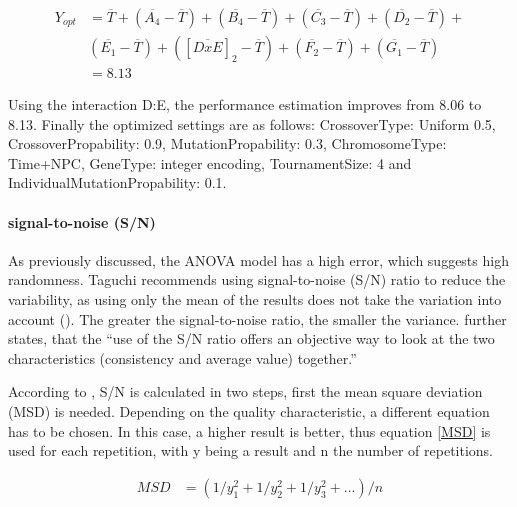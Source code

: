 \begin{equation} \label{optimum_perf_included_interaction}
	\begin{split}
		Y_{opt} &= \overline{T} + (\overline{A_4} - \overline{T}) + (\overline{B_4} - \overline{T}) + (\overline{C_3} - \overline{T}) + (\overline{D_2} - \overline{T}) + \\& (\overline{E_1} - \overline{T})  + ([\overline{DxE}]_2 - \overline{T})  + (\overline{F_2} - \overline{T}) + (\overline{G_1} - \overline{T}) \\
		&= 8.13
	\end{split}
\end{equation}

Using the interaction D:E, the performance estimation improves from 8.06 to 8.13. Finally the optimized settings are as follows:
CrossoverType: Uniform 0.5, CrossoverPropability: 0.9, MutationPropability: 0.3, ChromosomeType: Time+NPC, GeneType: integer encoding, TournamentSize: 4 and IndividualMutationPropability: 0.1.


\paragraph{signal-to-noise (S/N)}
As previously discussed, the ANOVA model has a high error, which suggests high randomness. Taguchi recommends using signal-to-noise (S/N) ratio to reduce the variability, as using only the mean of the results does not take the variation into account (\cite{roy_primer_1990}). The greater the signal-to-noise ratio, the smaller the variance. \cite{roy_primer_1990} further states, that the \enquote{use of the S/N ratio offers an objective way to look at the two characteristics (consistency and average value) together.}

According to \cite{roy_primer_1990}, S/N is calculated in two steps, first the mean square deviation (MSD) is needed. Depending on the quality characteristic, a different equation has to be chosen. In this case, a higher result is better, thus equation \ref{MSD} is used for each repetition, with y being a result and n the number of repetitions.

\begin{equation} \label{MSD}
	\begin{split}
		MSD & = (1/y^2_1 + 1/y^2_2 + 1/y^2_3 + ... ) / n
	\end{split}
\end{equation}

